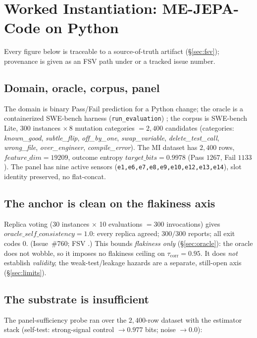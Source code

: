 \documentclass[10pt,twocolumn]{article}
\begin{document}
\section{Worked Instantiation: ME-JEPA-Code on Python}
\label{sec:instantiation}

Every figure below is traceable to a source-of-truth artifact
(\S\ref{sec:fsv}); provenance is given as an FSV path under
 or a tracked issue number.

\subsection{Domain, oracle, corpus, panel}
The domain is binary \textsf{Pass}/\textsf{Fail} prediction for a Python change;
the oracle is a containerized SWE-bench harness
(\texttt{run\_evaluation}) \citep{jimenez2024swebench}; the corpus is SWE-bench
Lite, $300$ instances $\times\,8$ mutation categories $=2{,}400$ candidates
(categories: \textit{known\_good}, \textit{subtle\_flip}, \textit{off\_by\_one},
\textit{swap\_variable}, \textit{delete\_test\_call}, \textit{wrong\_file},
\textit{over\_engineer}, \textit{compile\_error}). The MI dataset has $2{,}400$
rows, $\textit{feature\_dim}=19209$, outcome entropy
$\textit{target\_bits}=0.9978$ (Pass $1267$, Fail $1133$). The panel has nine
active sensors (\texttt{e1,e6,e7,e8,e9,e10,e12,e13,e14}), slot identity preserved,
no flat-concat.

\subsection{The anchor is clean on the flakiness axis}
Replica voting (30 instances $\times$ 10 evaluations $=300$ invocations) gives
$\textit{oracle\_self\_consistency}=1.0$: every replica agreed; $300/300$ reports;
all exit codes $0$. (Issue~\#760; FSV .)
This bounds \emph{flakiness only} (\S\ref{sec:oracle}): the oracle does not wobble,
so it imposes no flakiness ceiling on $\tau_{\mathrm{corr}}=0.95$. It does
\emph{not} establish \emph{validity}; the weak-test/leakage hazards
\citep{aleithan2024swebenchplus, wang2025solved, openai2026swebench} are a
separate, still-open axis (\S\ref{sec:limits}).

\subsection{The substrate is insufficient}
The panel-sufficiency probe ran over the $2{,}400$-row dataset with the estimator
stack (self-test: strong-signal control $\to0.977$ bits; noise $\to0.0$):
\end{document}

